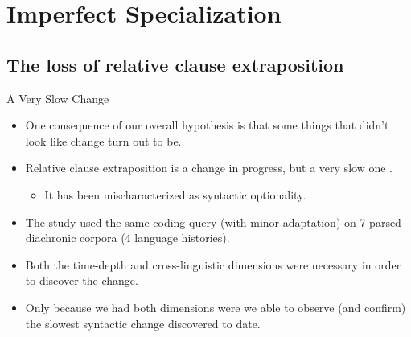 \documentclass[hyperref={pdfpagelabels=false}]{beamer}
\begin{document}
\section{Imperfect Specialization}
\subsection{The loss of relative clause extraposition}

\begin{frame}{A Very Slow Change}
\begin{itemize}
    \item One consequence of our overall hypothesis is that some things that didn't look like change turn out to be.
    \item Relative clause extraposition is a change in progress, but a very slow one \small{\citep[][]{wallenbergForthcoming, wallenberg2013b, fruehwaldwallenberginprep}}.
        \begin{itemize}
        \item It has been mischaracterized as syntactic optionality.
        \end{itemize}
    \item The study used the same coding query (with minor adaptation) on 7 parsed diachronic corpora (4 language histories).
    \item Both the time-depth and cross-linguistic dimensions were necessary in order to discover the change.
    \item Only because we had both dimensions were we able to observe (and confirm) the slowest syntactic change discovered to date.
    \end{itemize}
\end{frame}
\end{document}
